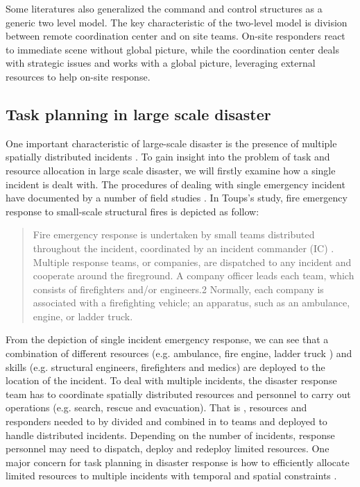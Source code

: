 Some literatures \cite{Chen2005,Chen2008} also generalized the command and control structures as a generic two level model. The key characteristic of the two-level model is division between remote coordination center and on site teams.  On-site responders react to immediate scene without global picture, while the coordination center deals with strategic issues and works with a global picture, leveraging external resources to help on-site response. \\


\subsection{Task planning in large scale disaster} \label{sec:LRtaskplanning}
One important characteristic of large-scale disaster is the presence of multiple spatially distributed incidents \cite{Chen2005}. To gain insight into the problem of task and resource allocation in large scale disaster, we will firstly examine how a single incident is dealt with. The procedures of dealing with single emergency incident have documented by a number of field studies \cite{Comfort2004,Dawes2004,Petrescu-prahova2005}. In Toups's \cite{Toups2011} study, fire emergency response to small-scale structural fires is depicted as follow: 

\begin{quote}
Fire emergency response is undertaken by small teams distributed throughout the incident, coordinated by an incident commander (IC) . Multiple response teams, or companies, are dispatched to any incident and cooperate around the fireground. A company officer leads each team, which consists of firefighters and/or engineers.2 Normally, each company is associated with a firefighting vehicle; an apparatus, such as an ambulance, engine, or ladder truck.\\
\end{quote}

From the depiction of single incident emergency response, we can see that a combination of different resources (e.g. ambulance, fire engine, ladder truck ) and skills (e.g. structural engineers, firefighters and medics) are deployed to the location of the incident. To deal with multiple incidents, the disaster response team has to coordinate spatially distributed resources and personnel to carry out operations (e.g. search, rescue and evacuation)\cite{Chen2005}. That is , resources and responders needed to by divided and combined in to teams and deployed to handle distributed incidents. Depending on the number of incidents, response personnel may need to dispatch, deploy and redeploy limited resources. One major concern for task planning in disaster response is how to efficiently allocate limited resources to multiple incidents with temporal and spatial constraints \cite{Bradshaw2011}.\\

